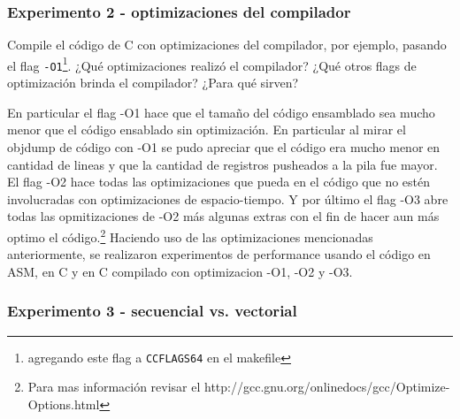 \subsubsection{Experimento 2 - optimizaciones del compilador}

Compile el código de C con optimizaciones del compilador, por ejemplo, pasando el flag \verb|-O1|\footnote{agregando este flag a \texttt{CCFLAGS64} en el makefile}. 
¿Qué optimizaciones realizó el compilador?
¿Qué otros flags de optimización brinda el compilador?
¿Para qué sirven?

\vspace*{0.3cm} \noindent

En particular el flag -O1 hace que el tamaño del c\'odigo ensamblado
sea mucho menor que el c\'odigo ensablado sin optimizaci\'on. En particular al mirar el objdump de c\'odigo con -O1 se pudo apreciar que el c\'odigo era
mucho menor en cantidad de lineas y que la cantidad de registros pusheados a la pila fue mayor.\newline
El flag -O2 hace todas las optimizaciones que pueda en el c\'odigo que no est\'en involucradas con optimizaciones de espacio-tiempo. Y por \'ultimo el flag
-O3 abre todas las opmitizaciones de -O2 m\'as algunas extras con el fin de hacer aun m\'as optimo el c\'odigo.\footnote{Para mas informaci\'on revisar el
http://gcc.gnu.org/onlinedocs/gcc/Optimize-Options.html}\newline
 Haciendo uso de las optimizaciones mencionadas anteriormente, se realizaron experimentos de performance usando el c\'odigo en ASM, en C y en C 
compilado con optimizacion -O1, -O2 y -O3.

\vspace*{0.3cm} \noindent
\subsubsection{Experimento 3 - secuencial vs. vectorial}

